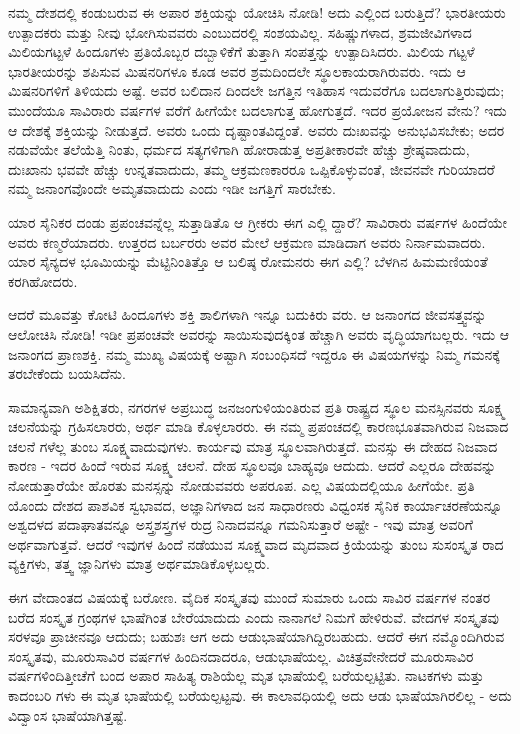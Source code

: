 ನಮ್ಮ ದೇಶದಲ್ಲಿ ಕಂಡುಬರುವ ಈ ಅಪಾರ ಶಕ್ತಿಯನ್ನು ಯೋಚಿಸಿ ನೋಡಿ! ಅದು ಎಲ್ಲಿಂದ ಬರುತ್ತಿದೆ? ಭಾರತೀಯರು ಉತ್ಪಾದಕರು ಮತ್ತು ನೀವು ಭೋಗಿಸುವವರು ಎಂಬುದರಲ್ಲಿ ಸಂಶಯವಿಲ್ಲ. ಸಹಿಷ್ಣುಗಳಾದ, ಶ್ರಮಜೀವಿಗಳಾದ ಮಿಲಿಯಗಟ್ಟಳೆ ಹಿಂದೂಗಳು ಪ್ರತಿಯೊಬ್ಬರ ದಬ್ಬಾಳಿಕೆಗೆ ತುತ್ತಾಗಿ ಸಂಪತ್ತನ್ನು ಉತ್ಪಾದಿಸಿದರು. ಮಿಲಿಯ ಗಟ್ಟಳೆ ಭಾರತೀಯರನ್ನು ಶಪಿಸುವ ಮಿಷನರಿಗಳೂ ಕೂಡ ಅವರ ಶ್ರಮದಿಂದಲೇ ಸ್ಥೂಲಕಾಯರಾಗಿರುವರು. ಇದು ಆ ಮಿಷನರಿಗಳಿಗೆ ತಿಳಿಯದು ಅಷ್ಟೆ. ಅವರ ಬಲಿದಾನ ದಿಂದಲೇ ಜಗತ್ತಿನ ಇತಿಹಾಸ ಇದುವರೆಗೂ ಬದಲಾಗುತ್ತಿರುವುದು; ಮುಂದೆಯೂ ಸಾವಿರಾರು ವರ್ಷಗಳ ವರೆಗೆ ಹೀಗೆಯೇ ಬದಲಾಗುತ್ತ ಹೋಗುತ್ತದೆ. ಇದರ ಪ್ರಯೋಜನ ವೇನು? ಇದು ಆ ದೇಶಕ್ಕೆ ಶಕ್ತಿಯನ್ನು ನೀಡುತ್ತದೆ. ಅವರು ಒಂದು ದೃಷ್ಟಾಂತವಿದ್ದಂತೆ. ಅವರು ದುಃಖವನ್ನು ಅನುಭವಿಸಬೇಕು; ಅದರ ನಡುವೆಯೇ ತಲೆಯೆತ್ತಿ ನಿಂತು, ಧರ್ಮದ ಸತ್ಯಗಳಿಗಾಗಿ ಹೋರಾಡುತ್ತ ಅಪ್ರತೀಕಾರವೇ ಹೆಚ್ಚು ಶ್ರೇಷ್ಠವಾದುದು, ದುಃಖಾನು ಭವವೇ ಹೆಚ್ಚು ಉನ್ನತವಾದುದು, ತಮ್ಮ ಆಕ್ರಮಣಕಾರರೂ ಒಪ್ಪಿಕೊಳ್ಳುವಂತೆ, ಜೀವನವೇ ಗುರಿಯಾದರೆ ನಮ್ಮ ಜನಾಂಗವೊಂದೇ ಅಮೃತವಾದುದು ಎಂದು ಇಡೀ ಜಗತ್ತಿಗೆ ಸಾರಬೇಕು.

ಯಾರ ಸೈನಿಕರ ದಂಡು ಪ್ರಪಂಚವನ್ನೆಲ್ಲ ಸುತ್ತಾಡಿತೊ ಆ ಗ್ರೀಕರು ಈಗ ಎಲ್ಲಿ ದ್ದಾರೆ? ಸಾವಿರಾರು ವರ್ಷಗಳ ಹಿಂದೆಯೇ ಅವರು ಕಣ್ಮರೆಯಾದರು. ಉತ್ತರದ ಬರ್ಬರರು ಅವರ ಮೇಲೆ ಆಕ್ರಮಣ ಮಾಡಿದಾಗ ಅವರು ನಿರ್ನಾಮವಾದರು. ಯಾರ ಸೈನ್ಯದಳ ಭೂಮಿಯನ್ನು ಮೆಟ್ಟಿನಿಂತಿತ್ತೊ ಆ ಬಲಿಷ್ಠ ರೋಮನರು ಈಗ ಎಲ್ಲಿ? ಬೆಳಗಿನ ಹಿಮಮಣಿಯಂತೆ ಕರಗಿಹೋದರು.

ಆದರೆ ಮೂವತ್ತು ಕೋಟಿ ಹಿಂದೂಗಳು ಶಕ್ತಿ ಶಾಲಿಗಳಾಗಿ ಇನ್ನೂ ಬದುಕಿರು ವರು. ಆ ಜನಾಂಗದ ಜೀವಸತ್ತ್ವವನ್ನು ಆಲೋಚಿಸಿ ನೋಡಿ! ಇಡೀ ಪ್ರಪಂಚವೇ ಅವರನ್ನು ಸಾಯಿಸುವುದಕ್ಕಿಂತ ಹೆಚ್ಚಾಗಿ ಅವರು ವೃದ್ಧಿಯಾಗಬಲ್ಲರು. ಇದು ಆ ಜನಾಂಗದ ಪ್ರಾಣಶಕ್ತಿ. ನಮ್ಮ ಮುಖ್ಯ ವಿಷಯಕ್ಕೆ ಅಷ್ಟಾಗಿ ಸಂಬಂಧಿಸದೆ ಇದ್ದರೂ ಈ ವಿಷಯಗಳನ್ನು ನಿಮ್ಮ ಗಮನಕ್ಕೆ ತರಬೇಕೆಂದು ಬಯಸಿದೆನು.

ಸಾಮಾನ್ಯವಾಗಿ ಅಶಿಕ್ಷಿತರು, ನಗರಗಳ ಅಪ್ರಬುದ್ಧ ಜನಜಂಗುಳಿಯಂತಿರುವ ಪ್ರತಿ ರಾಷ್ಟ್ರದ ಸ್ಥೂಲ ಮನಸ್ಸಿನವರು ಸೂಕ್ಷ್ಮ ಚಲನೆಯನ್ನು ಗ್ರಹಿಸಲಾರರು, ಅರ್ಥ ಮಾಡಿ ಕೊಳ್ಳಲಾರರು. ಈ ನಮ್ಮ ಪ್ರಪಂಚದಲ್ಲಿ ಕಾರಣಭೂತವಾಗಿರುವ ನಿಜವಾದ ಚಲನೆ ಗಳೆಲ್ಲ ತುಂಬ ಸೂಕ್ಷ್ಮವಾದುವುಗಳು. ಕಾರ್ಯವು ಮಾತ್ರ ಸ್ಥೂಲವಾಗಿರುತ್ತದೆ. ಮನಸ್ಸು ಈ ದೇಹದ ನಿಜವಾದ ಕಾರಣ - ಇದರ ಹಿಂದೆ ಇರುವ ಸೂಕ್ಷ್ಮ ಚಲನೆ. ದೇಹ ಸ್ಥೂಲವೂ ಬಾಹ್ಯವೂ ಆದುದು. ಆದರೆ ಎಲ್ಲರೂ ದೇಹವನ್ನು ನೋಡುತ್ತಾರೆಯೇ ಹೊರತು ಮನಸ್ಸನ್ನು ನೋಡುವವರು ಅಪರೂಪ. ಎಲ್ಲ ವಿಷಯದಲ್ಲಿಯೂ ಹೀಗೆಯೇ. ಪ್ರತಿ ಯೊಂದು ದೇಶದ ಪಾಶವಿಕ ಸ್ವಭಾವದ, ಅಜ್ಞಾನಿಗಳಾದ ಜನ ಸಾಧಾರಣರು ವಿಧ್ವಂಸಕ ಸೈನಿಕ ಕಾರ್ಯಾಚರಣೆಯನ್ನೂ ಅಶ್ವದಳದ ಪದಾಘಾತವನ್ನೂ ಅಸ್ತ್ರಶಸ್ತ್ರಗಳ ರುದ್ರ ನಿನಾದವನ್ನೂ ಗಮನಿಸುತ್ತಾರೆ ಅಷ್ಟೇ - ಇವು ಮಾತ್ರ ಅವರಿಗೆ ಅರ್ಥವಾಗುತ್ತವೆ. ಆದರೆ ಇವುಗಳ ಹಿಂದೆ ನಡೆಯುವ ಸೂಕ್ಷ್ಮವಾದ ಮೃದವಾದ ಕ್ರಿಯೆಯನ್ನು ತುಂಬ ಸುಸಂಸ್ಕೃತ ರಾದ ವ್ಯಕ್ತಿಗಳು, ತತ್ತ್ವ ಜ್ಞಾನಿಗಳು ಮಾತ್ರ ಅರ್ಥಮಾಡಿಕೊಳ್ಳಬಲ್ಲರು.

ಈಗ ವೇದಾಂತದ ವಿಷಯಕ್ಕೆ ಬರೋಣ. ವೈದಿಕ ಸಂಸ್ಕೃತವು ಮುಂದೆ ಸುಮಾರು ಒಂದು ಸಾವಿರ ವರ್ಷಗಳ ನಂತರ ಬರೆದ ಸಂಸ್ಕೃತ ಗ್ರಂಥಗಳ ಭಾಷೆಗಿಂತ ಬೇರೆಯಾದುದು ಎಂದು ನಾನಾಗಲೆ ನಿಮಗೆ ಹೇಳಿರುವೆ. ವೇದಗಳ ಸಂಸ್ಕೃತವು ಸರಳವೂ ಪ್ರಾಚೀನವೂ ಆದುದು; ಬಹುಶಃ ಆಗ ಅದು ಆಡುಭಾಷೆಯಾಗಿದ್ದಿರಬಹುದು. ಆದರೆ ಈಗ ನಮ್ಮೊಂದಿಗಿರುವ ಸಂಸ್ಕೃತವು, ಮೂರುಸಾವಿರ ವರ್ಷಗಳ ಹಿಂದಿನದಾದರೂ, ಆಡುಭಾಷೆಯಲ್ಲ. ವಿಚಿತ್ರವೇನೇದರೆ ಮೂರುಸಾವಿರ ವರ್ಷಗಳಿಂದಿತ್ತೀಚೆಗೆ ಬಂದ ಅಪಾರ ಸಾಹಿತ್ಯ ರಾಶಿಯೆಲ್ಲ ಮೃತ ಭಾಷೆಯಲ್ಲಿ ಬರೆಯಲ್ಪಟ್ಟಿತು. ನಾಟಕಗಳು ಮತ್ತು ಕಾದಂಬರಿ ಗಳು ಈ ಮೃತ ಭಾಷೆಯಲ್ಲಿ ಬರೆಯಲ್ಪಟ್ಟವು. ಈ ಕಾಲಾವಧಿಯಲ್ಲಿ ಅದು ಆಡು ಭಾಷೆಯಾಗಿರಲಿಲ್ಲ - ಅದು ವಿದ್ವಾಂಸ ಭಾಷೆಯಾಗಿತ್ತಷ್ಟೆ.

